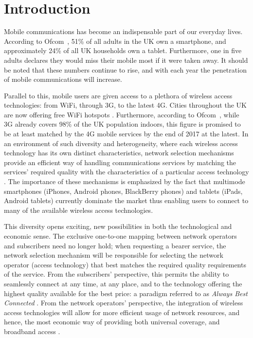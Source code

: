 \chapter{Introduction} %
\label{cha:introduction}

\minitoc
\vspace{10mm}

Mobile communications has become an indispensable part of our everyday lives. According to Ofcom~\cite{OfcomReport2013}, 51\% of all adults in the UK own a smartphone, and approximately 24\% of all UK households own a tablet. Furthermore, one in five adults declares they would miss their mobile most if it were taken away. It should be noted that these numbers continue to rise, and with each year the penetration of mobile communications will increase.

Parallel to this, mobile users are given access to a plethora of wireless access technologies: from WiFi, through 3G, to the latest 4G. Cities throughout the UK are now offering free WiFi hotspots \cite{BBCWiFiGlasgow2014}. Furthermore, according to Ofcom~\cite{OfcomLTE2013}, while 3G already covers 98\% of the UK population indoors, this figure is promised to be at least matched by the 4G mobile services by the end of 2017 at the latest. In an environment of such diversity and heterogeneity, where each wireless access technology has its own distinct characteristics, network selection mechanisms provide an efficient way of handling communications services by matching the services' required quality with the characteristics of a particular access technology \cite{HossainBeaubrun09}. The importance of these mechanisms is emphasized by the fact that multimode smartphones (iPhones, Android phones, BlackBerry phones) and tablets (iPads, Android tablets) currently dominate the market thus enabling users to connect to many of the available wireless access technologies.

This diversity opens exciting, new possibilities in both the technological and economic sense. The exclusive one-to-one mapping between network operators and subscribers need no longer hold; when requesting a bearer service, the network selection mechanism will be responsible for selecting the network operator (access technology) that best matches the required quality requirements of the service. From the subscribers' perspective, this permits the ability to seamlessly connect at any time, at any place, and to the technology offering the highest quality available for the best price: a paradigm referred to as \emph{Always Best Connected} \cite{ABC03}. From the network operators' perspective, the integration of wireless access technologies will allow for more efficient usage of network resources, and hence, the most economic way of providing both universal coverage, and broadband access \cite{HossainBeaubrun09}.

